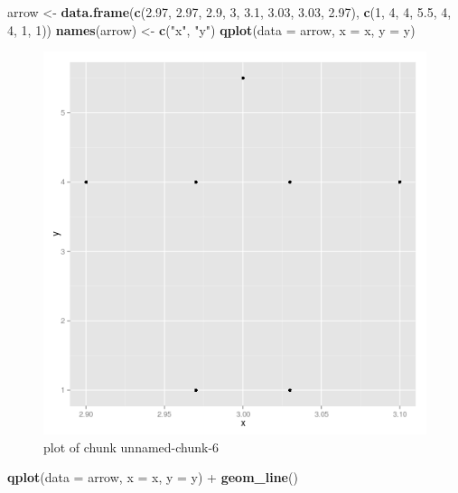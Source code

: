 \documentclass[]{article}
\makeatletter
\newenvironment{Shaded}{}{}
\newcommand{\KeywordTok}[1]{\textcolor[rgb]{0.00,0.44,0.13}{\textbf{{#1}}}}
\newcommand{\DataTypeTok}[1]{\textcolor[rgb]{0.56,0.13,0.00}{{#1}}}
\newcommand{\DecValTok}[1]{\textcolor[rgb]{0.25,0.63,0.44}{{#1}}}
\newcommand{\FloatTok}[1]{\textcolor[rgb]{0.25,0.63,0.44}{{#1}}}
\newcommand{\StringTok}[1]{\textcolor[rgb]{0.25,0.44,0.63}{{#1}}}
\newcommand{\NormalTok}[1]{{#1}}
\def\maxwidth{\ifdim\Gin@nat@width>\linewidth\linewidth
\else\Gin@nat@width\fi}
\let\Oldincludegraphics\includegraphics
\renewcommand{\includegraphics}[1]{\Oldincludegraphics[width=\maxwidth]{#1}}
\makeatother
\begin{document}
\begin{Shaded}
\begin{Highlighting}[]
\NormalTok{arrow <-}\StringTok{ }\KeywordTok{data.frame}\NormalTok{(}\KeywordTok{c}\NormalTok{(}\FloatTok{2.97}\NormalTok{, }\FloatTok{2.97}\NormalTok{, }\FloatTok{2.9}\NormalTok{, }\DecValTok{3}\NormalTok{, }\FloatTok{3.1}\NormalTok{, }\FloatTok{3.03}\NormalTok{, }\FloatTok{3.03}\NormalTok{, }\FloatTok{2.97}\NormalTok{), }\KeywordTok{c}\NormalTok{(}\DecValTok{1}\NormalTok{, }\DecValTok{4}\NormalTok{, }\DecValTok{4}\NormalTok{, }
    \FloatTok{5.5}\NormalTok{, }\DecValTok{4}\NormalTok{, }\DecValTok{4}\NormalTok{, }\DecValTok{1}\NormalTok{, }\DecValTok{1}\NormalTok{))}
\KeywordTok{names}\NormalTok{(arrow) <-}\StringTok{ }\KeywordTok{c}\NormalTok{(}\StringTok{"x"}\NormalTok{, }\StringTok{"y"}\NormalTok{)}
\KeywordTok{qplot}\NormalTok{(}\DataTypeTok{data =} \NormalTok{arrow, }\DataTypeTok{x =} \NormalTok{x, }\DataTypeTok{y =} \NormalTok{y)}
\end{Highlighting}
\end{Shaded}

\begin{figure}[htbp]
\centering
\includegraphics{figure/unnamed-chunk-61.png}
\caption{plot of chunk unnamed-chunk-6}
\end{figure}

\begin{Shaded}
\begin{Highlighting}[]
\KeywordTok{qplot}\NormalTok{(}\DataTypeTok{data =} \NormalTok{arrow, }\DataTypeTok{x =} \NormalTok{x, }\DataTypeTok{y =} \NormalTok{y) +}\StringTok{ }\KeywordTok{geom_line}\NormalTok{()}
\end{Highlighting}
\end{Shaded}
\end{document}
